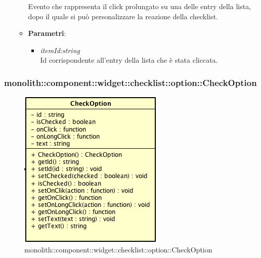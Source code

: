\begin{itemize}
\begin{itemize}
	Evento che rappresenta il click prolungato su una delle entry della lista, dopo il quale si può personalizzare la reazione della checklist.
		\item{\textbf{Parametri}: \begin{itemize}
		\item \textit{itemId:string}\\
		Id corrispondente all'entry della lista che è stata cliccata.
		\end{itemize}}
	\end{itemize}
\end{itemize}

\subsubsection{monolith::component::widget::checklist::option::CheckOption}

\label{monolith::component::widget::checklist::option::CheckOption}
\begin{figure}[ht]
	\centering
	\includegraphics[scale=0.5]{Sezioni/SottosezioniST/img/CheckOption.png}
	\caption{monolith::component::widget::checklist::option::CheckOption}
\end{figure}


